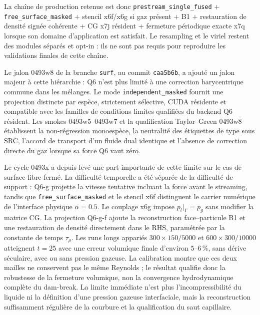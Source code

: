 \documentclass[11pt,a4paper]{article}
\begin{document}
La chaîne de production retenue est donc \texttt{prestream\_single\_fused} + \texttt{free\_surface\_masked} + stencil x6f/x6g si gaz présent + B1 + restauration de densité signée cohérente + CG x7j résident + fermeture périodique exacte x7q lorsque son domaine d'application est satisfait. Le resampling et le viriel restent des modules séparés et opt-in : ils ne sont pas requis pour reproduire les validations finales de cette chaîne.

Le jalon 0493w8 de la branche \texttt{surf}, au commit \texttt{caa5b6b}, a ajouté un jalon majeur à cette hiérarchie : Q6 n'est plus limité à une correction barycentrique commune dans les mélanges. Le mode \texttt{independent\_masked} fournit une projection distincte par espèce, strictement sélective, CUDA résidente et compatible avec les familles de conditions limites qualifiées du backend Q6 résident. Les smokes 0493w5--0493w7 et la qualification Taylor--Green 0493w8 établissent la non-régression monoespèce, la neutralité des étiquettes de type sous SRC, l'accord de transport d'un fluide dual identique et l'absence de correction directe du gaz lorsque sa force Q6 vaut zéro.

Le cycle 0493x a depuis levé une part importante de cette limite sur le cas de surface libre fermé. La difficulté temporelle a été séparée de la difficulté de support : Q6-g projette la vitesse tentative incluant la force avant le streaming, tandis que \texttt{free\_surface\_masked} et le stencil x6f distinguent le carrier numérique de l'interface physique $\alpha=0.5$. Le couplage x6g impose $p_l|_\Gamma=p_g$ sans modifier la matrice CG. La projection Q6-g-f ajoute la reconstruction face--particule B1 et une restauration de densité directement dans le RHS, paramétrée par la constante de temps $\tau_\rho$. Les runs longs appariés $300\times150/5000$ et $600\times300/10000$ atteignent $t=25$ avec une erreur volumique finale d'environ $5$--$6\,\%$, sans dérive séculaire, avec ou sans pression gazeuse. La calibration montre que ces deux mailles ne conservent pas le même Reynolds ; le résultat qualifie donc la robustesse de la fermeture volumique, non la convergence hydrodynamique complète du dam-break. La limite immédiate n'est plus l'incompressibilité du liquide ni la définition d'une pression gazeuse interfaciale, mais la reconstruction suffisamment régulière de la courbure et la qualification du saut capillaire.
\end{document}
